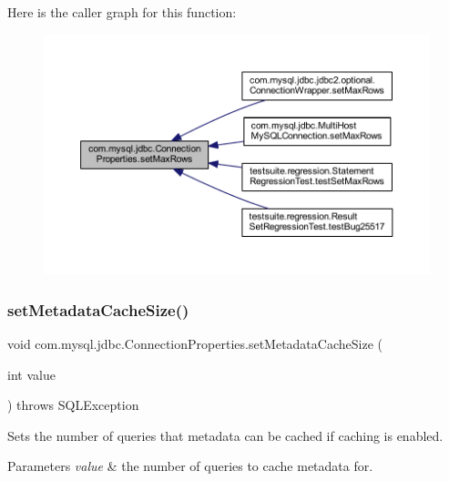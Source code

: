 Here is the caller graph for this function\+:\nopagebreak
\begin{figure}[H]
\begin{center}
\leavevmode
\includegraphics[width=350pt]{interfacecom_1_1mysql_1_1jdbc_1_1_connection_properties_afbeac8befbc0374361e27aa4fead424a_icgraph}
\end{center}
\end{figure}
\mbox{\label{interfacecom_1_1mysql_1_1jdbc_1_1_connection_properties_aa29a8dc1d36b7044717dce95a3ddbc4e}} 
\subsubsection{\texorpdfstring{set\+Metadata\+Cache\+Size()}{setMetadataCacheSize()}}
{\footnotesize\ttfamily void com.\+mysql.\+jdbc.\+Connection\+Properties.\+set\+Metadata\+Cache\+Size (\begin{DoxyParamCaption}\item[{int}]{value }\end{DoxyParamCaption}) throws S\+Q\+L\+Exception}

Sets the number of queries that metadata can be cached if caching is enabled.


\begin{DoxyParams}{Parameters}
{\em value} & the number of queries to cache metadata for. \\
\hline
\end{DoxyParams}

